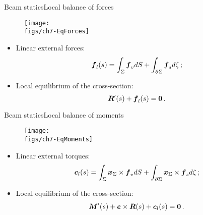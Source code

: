 \begin{frame}{Beam statics}{Local balance of forces}

\begin{figure}
\centering\texttt{[image: \\figs/ch7-EqForces]}
\end{figure}

\begin{itemize}
\item Linear external forces:
\begin{displaymath}
{\boldsymbol{f}}_l(s)=\int_\Sigma{\boldsymbol{f}}_vd S + \int_{\partial\Sigma}{\boldsymbol{f}}_sd\zeta\,;
\end{displaymath}
\item Local equilibrium of the cross-section:
\begin{displaymath}
{\boldsymbol{R}}'(s)+{\boldsymbol{f}}_l(s)={\bf 0}\,.
\end{displaymath}
\end{itemize}

\end{frame}

\begin{frame}{Beam statics}{Local balance of moments}

\begin{figure}
\centering\texttt{[image: \\figs/ch7-EqMoments]}
\end{figure}

\begin{itemize}
\item Linear external torques:
\begin{displaymath}
{\boldsymbol{c}}_l(s)=\int_\Sigma{\boldsymbol{x}}_\Sigma\times{\boldsymbol{f}}_vd S + \int_{\partial\Sigma}{\boldsymbol{x}}_\Sigma\times{\boldsymbol{f}}_sd\zeta\,;
\end{displaymath}
\item Local equilibrium of the cross-section:
\begin{displaymath}
{\boldsymbol{M}}'(s)+{\boldsymbol{e}}\times{\boldsymbol{R}}(s)+{\boldsymbol{c}}_l(s)={\bf 0}\,.
\end{displaymath}
\end{itemize}

\end{frame}

